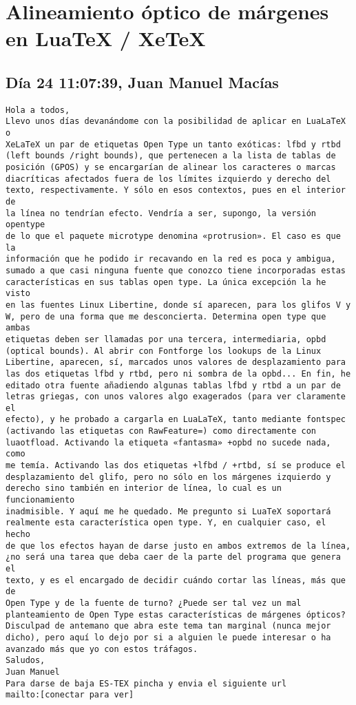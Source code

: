 \documentclass[a4paper,10pt]{article}
\begin{document}
\section{Alineamiento óptico de márgenes en LuaTeX / XeTeX}

\subsection{Día 24 11:07:39, Juan Manuel Macías}

\begin{lstlisting}
Hola a todos,
Llevo unos días devanándome con la posibilidad de aplicar en LuaLaTeX o 
XeLaTeX un par de etiquetas Open Type un tanto exóticas: lfbd y rtbd 
(left bounds /right bounds), que pertenecen a la lista de tablas de 
posición (GPOS) y se encargarían de alinear los caracteres o marcas 
diacríticas afectados fuera de los límites izquierdo y derecho del 
texto, respectivamente. Y sólo en esos contextos, pues en el interior de 
la línea no tendrían efecto. Vendría a ser, supongo, la versión opentype 
de lo que el paquete microtype denomina «protrusion». El caso es que la 
información que he podido ir recavando en la red es poca y ambigua, 
sumado a que casi ninguna fuente que conozco tiene incorporadas estas 
características en sus tablas open type. La única excepción la he visto 
en las fuentes Linux Libertine, donde sí aparecen, para los glifos V y 
W, pero de una forma que me desconcierta. Determina open type que ambas 
etiquetas deben ser llamadas por una tercera, intermediaria, opbd 
(optical bounds). Al abrir con Fontforge los lookups de la Linux 
Libertine, aparecen, sí, marcados unos valores de desplazamiento para 
las dos etiquetas lfbd y rtbd, pero ni sombra de la opbd... En fin, he 
editado otra fuente añadiendo algunas tablas lfbd y rtbd a un par de 
letras griegas, con unos valores algo exagerados (para ver claramente el 
efecto), y he probado a cargarla en LuaLaTeX, tanto mediante fontspec 
(activando las etiquetas con RawFeature=) como directamente con 
luaotfload. Activando la etiqueta «fantasma» +opbd no sucede nada, como 
me temía. Activando las dos etiquetas +lfbd / +rtbd, sí se produce el 
desplazamiento del glifo, pero no sólo en los márgenes izquierdo y 
derecho sino también en interior de línea, lo cual es un funcionamiento 
inadmisible. Y aquí me he quedado. Me pregunto si LuaTeX soportará 
realmente esta característica open type. Y, en cualquier caso, el hecho 
de que los efectos hayan de darse justo en ambos extremos de la línea, 
¿no será una tarea que deba caer de la parte del programa que genera el 
texto, y es el encargado de decidir cuándo cortar las líneas, más que de 
Open Type y de la fuente de turno? ¿Puede ser tal vez un mal 
planteamiento de Open Type estas características de márgenes ópticos?
Disculpad de antemano que abra este tema tan marginal (nunca mejor 
dicho), pero aquí lo dejo por si a alguien le puede interesar o ha 
avanzado más que yo con estos tráfagos.
Saludos,
Juan Manuel
Para darse de baja ES-TEX pincha y envia el siguiente url
mailto:[conectar para ver]

\end{lstlisting}
\end{document}
